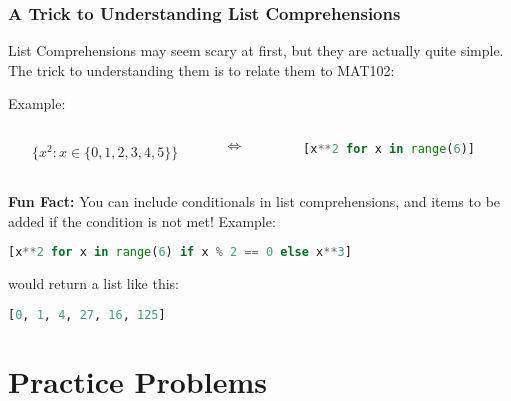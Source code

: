 \documentclass[hyperref={colorlinks,citecolor=blue,linkcolor=blue,urlcolor=blue}]{beamer}
\begin{document}
\begin{frame}[fragile]
  \frametitle{A Trick to Understanding List Comprehensions}
    List Comprehensions may seem scary at first, but they are actually quite simple. The trick to understanding them is to relate them to MAT102:

  Example:
  
  \begin{columns}[T]
    \begin{column}{0.4\textwidth}
    \begin{align*}
        \{x^2 : x \in \{0, 1, 2, 3, 4, 5\}\}
    \end{align*}
    \end{column}
    \hfill
    \begin{column}{0.1\textwidth}
    \begin{center}
    \Large $\iff$
    \end{center}
    \end{column}
    \hfill
    \begin{column}{0.5\textwidth}
    \begin{lstlisting}[language=Python, style=mystyle]
[x**2 for x in range(6)]
    \end{lstlisting}
    \end{column}
    \end{columns}


    \textbf{Fun Fact:} You can include conditionals in list comprehensions, and items to be added if the condition is not met! Example:
    \begin{lstlisting}[language=Python, style=mystyle]
[x**2 for x in range(6) if x % 2 == 0 else x**3]
    \end{lstlisting}
    would return a list like this:
    \begin{lstlisting}[language=Python, style=mystyle]
[0, 1, 4, 27, 16, 125]
    \end{lstlisting}
\end{frame}

\section{Practice Problems}
\end{document}
